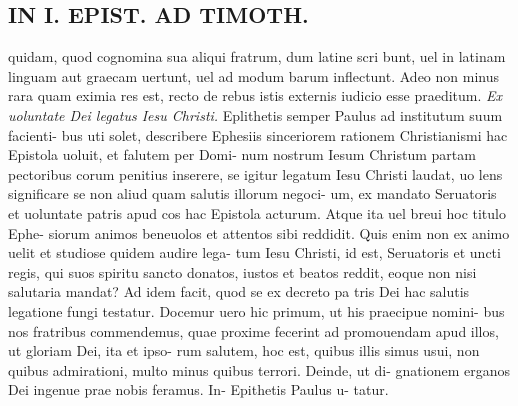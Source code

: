 \documentclass{article}
\begin{document}
\begin{pages}
\section*{IN I. EPIST. AD TIMOTH. }
\marginpar{[ p.compa- ]}\pstart quidam, quod cognomina sua aliqui fratrum, dum latine scri bunt, uel in latinam linguam aut graecam uertunt, uel ad modum barum inflectunt. Adeo non minus rara quam eximia res est, recto de rebus istis externis iudicio esse praeditum.   \pend
\textit{Ex uoluntate Dei legatus Iesu Christi. }\pstart Eplithetis semper Paulus ad institutum suum facienti- bus uti solet, describere Ephesiis sinceriorem rationem Christianismi hac Epistola uoluit, et falutem per Domi- num nostrum Iesum Christum partam pectoribus   corum penitius inserere, se igitur legatum Iesu Christi laudat, uo lens significare se non aliud quam salutis illorum negoci- um, ex mandato Seruatoris et uoluntate patris apud cos hac Epistola acturum.  Atque ita uel breui hoc titulo Ephe- siorum animos beneuolos et attentos sibi reddidit.  Quis enim non ex animo uelit et studiose quidem audire lega- tum Iesu Christi, id est, Seruatoris et uncti regis, qui suos spiritu sancto donatos, iustos et beatos reddit, eoque non nisi salutaria mandat? Ad idem facit, quod se ex decreto pa tris Dei hac salutis legatione fungi testatur.   \pend\pstart Docemur uero hic primum, ut his praecipue nomini- bus nos fratribus commendemus, quae proxime fecerint ad promouendam apud illos, ut gloriam Dei, ita et ipso- rum salutem, hoc est, quibus illis simus usui, non quibus admirationi, multo minus quibus terrori.  Deinde, ut di- gnationem erganos Dei ingenue prae nobis feramus.  In-  \pend\pstart  \pendQuibus Epithetis Paulus u- tatur.  

\end{pages}
\end{document}
